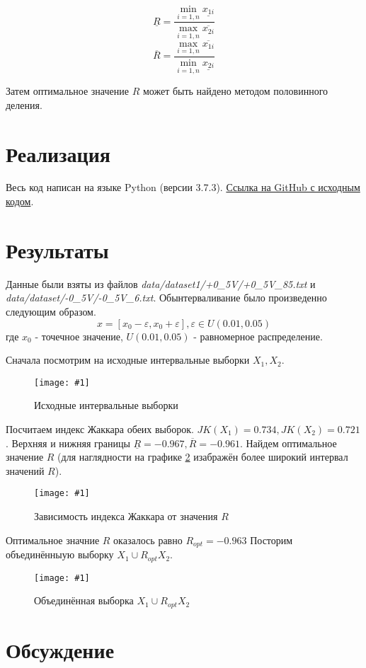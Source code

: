 \documentclass[a4paper,12pt]{article}
\newcommand{\plot}[3]{
    \begin{figure}[H]
        \begin{center}
            \texttt{[image: \#1]}
            \caption{#2}
            \label{#3}
        \end{center}
    \end{figure}
}
\begin{document}
    \begin{equation}
        \underline{R} = \frac{\min_{i=1,n}\underline{x_{1i}}}{\max_{i=1,n}\overline{x_{2i}}}
    \end{equation}
    \begin{equation}
        \overline{R} = \frac{\max_{i=1,n}\overline{x_{1i}}}{\min_{i=1,n}\underline{x_{2i}}}
    \end{equation}

    Затем оптимальное значение $ R $ может быть найдено методом половинного деления.

    \section{Реализация}
    \quad Весь код написан на языке Python (версии 3.7.3).
    \href{https://github.com/kirillkuks/Intervals/tree/master/lab1}{Ссылка на GitHub с исходным кодом}.

    \section{Результаты}
    \quad Данные были взяты из файлов \textsl{data/dataset1/+0\_5V/+0\_5V\_85.txt} и \textsl{data/dataset/-0\_5V/-0\_5V\_6.txt}.
    Обынтерваливание было произведенно следующим образом.
    \begin{equation}
        x = [x_0 - \varepsilon, x_0 + \varepsilon], \varepsilon \in U(0.01, 0.05)
    \end{equation}
    где $ x_0 $ - точечное значение, $ U(0.01, 0.05) $ - равномерное распределение.
    
    Сначала посмотрим на исходные интервальные выборки $ X_1, X_2 $.
    \plot{X1X2}{Исходные интервальные выборки}{p:x1x2}

    Посчитаем индекс Жаккара обеих выборок. $ JK(X_1) = 0.734, JK(X_2) = 0.721 $.
    Верхняя и нижняя границы $ \underline{R} = -0.967, \overline{R} = -0.961 $.
    Найдем оптимальное значение $ R $
    (для наглядности на графике \ref{p:jaccard} изабражён более широкий интервал значений $ R $).
  
    \plot{Jaccard}{Зависимость индекса Жаккара от значения $R$}{p:jaccard}

    Оптимальное значние $ R $ оказалось равно $ R_{opt} = -0.963 $
    Посторим объединённыую выборку $ X_1 \cup R_{opt} X_2 $.

    \plot{X1RX2}{Объединённая выборка $ X_1 \cup R_{opt} X_2 $}{p:x1rx2}

    \section{Обсуждение}
\end{document}
